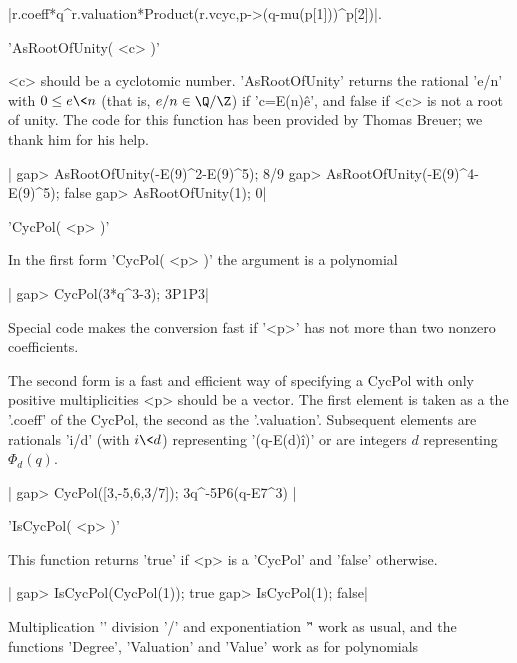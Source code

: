 |r.coeff*q^r.valuation*Product(r.vcyc,p->(q-mu(p[1]))^p[2])|.

%
%

'AsRootOfUnity( <c> )'

<c>  should be  a cyclotomic  number. 'AsRootOfUnity'  returns the rational
'e/n'  with $0\le e\<n$ (that is,  $e/n\in\Q/\Z$) if 'c=E(n)\^e', and false
if <c> is not a root of unity. The code for this function has been provided
by Thomas Breuer; we thank him for his help.

|    gap> AsRootOfUnity(-E(9)^2-E(9)^5);
    8/9
    gap> AsRootOfUnity(-E(9)^4-E(9)^5);
    false
    gap> AsRootOfUnity(1);
    0|

%
%

'CycPol( <p> )'

In the first form 'CycPol( <p> )' the argument is a polynomial\:

|    gap> CycPol(3*q^3-3);
    3P1P3|

Special code  makes the conversion fast  if '<p>' has not  more than two
nonzero coefficients.

The  second form is  a fast and  efficient way of  specifying a CycPol with
only positive multiplicities\: <p> should be a vector. The first element is
taken  as a  the '.coeff'  of the  CycPol, the  second as the '.valuation'.
Subsequent  elements  are  rationals  'i/d'  (with  $i\<  d$)  representing
'(q-E(d)\^i)' or are integers $d$ representing $\Phi_d(q)$.

|    gap> CycPol([3,-5,6,3/7]);
    3q^-5P6(q-E7^3) |

%
%

'IsCycPol( <p> )'

This function returns 'true' if <p> is a 'CycPol' and 'false' otherwise.

|    gap> IsCycPol(CycPol(1));
    true
    gap> IsCycPol(1);        
    false|


Multiplication '\*' division '/' and exponentiation '\^' work as usual, and
the functions 'Degree', 'Valuation' and 'Value' work as for polynomials\:

